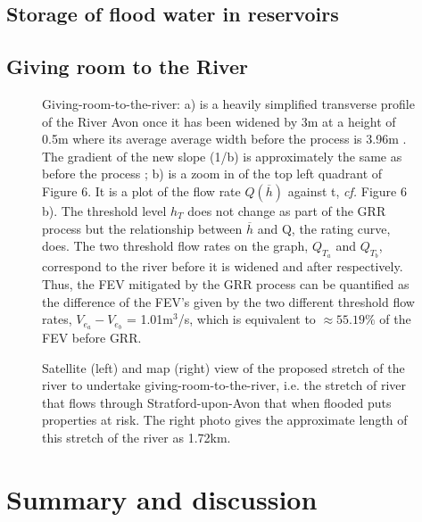 \documentclass[11pt,a4paper]{article}
\begin{document}
\subsection{Storage of flood water in reservoirs}

\subsection{Giving room to the River}

\begin{figure}[H]
\begin{center}
\hfill
{}
\caption{Giving-room-to-the-river: a) is a heavily simplified transverse profile of the River Avon once it has been widened by 3m at a height of 0.5m where its average average width before the process is 3.96m \cite{canal}. The gradient of the new slope (1/b) is approximately the same as before the process {;} b) is a zoom in of the top left quadrant of Figure 6. It is a plot of the flow rate $Q(\overline{h})$ against t, \textit{cf.} Figure 6 b). The threshold level $h_T$ does not change as part of the GRR process but the relationship between $\overline{h}$ and Q, the rating curve, does. The two threshold flow rates on the graph, $Q_{T_a}$ and $Q_{T_b}$, correspond to the river before it is widened and after respectively. Thus, the FEV mitigated by the GRR process can be quantified as the difference of the FEV's given by the two different threshold flow rates, $V_{e_a}-V_{e_b}$ = 1.01m$^3$/s, which is equivalent to $\approx 55.19\%$ of the FEV before GRR.}
\end{center}
\end{figure}

\begin{figure}[H]
\caption{Satellite (left) and map (right) view \cite{maps} of the proposed stretch of the river to undertake giving-room-to-the-river, i.e. the stretch of river that flows through Stratford-upon-Avon that when flooded puts properties at risk. The right photo gives the approximate length of this stretch of the river as 1.72km.}
\end{figure}


\newpage
\section{Summary and discussion}
\end{document}
